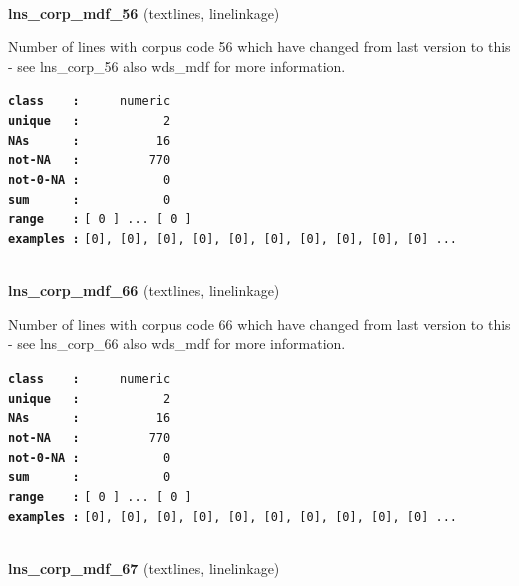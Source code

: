 \documentclass[]{article}
\begin{document}
~

\textbf{lns\_corp\_mdf\_56} (textlines, linelinkage)

Number of lines with corpus code 56 which have changed from last version
to this - see lns\_corp\_56 also wds\_mdf for more information.

\textbf{\texttt{class\ \ \ \ :}} \texttt{~~~~~numeric}\\
\textbf{\texttt{unique\ \ \ :}} \texttt{~~~~~~~~~~~2}\\
\textbf{\texttt{NAs\ \ \ \ \ \ :}} \texttt{~~~~~~~~~~16}\\
\textbf{\texttt{not-NA\ \ \ :}} \texttt{~~~~~~~~~770}\\
\textbf{\texttt{not-0-NA\ :}} \texttt{~~~~~~~~~~~0}\\
\textbf{\texttt{sum\ \ \ \ \ \ :}} \texttt{~~~~~~~~~~~0}\\
\textbf{\texttt{range\ \ \ \ :}}
\texttt{{[}\ 0\ {]}\ ...\ {[}\ 0\ {]}}\\
\textbf{\texttt{examples\ :}}
\texttt{{[}0{]},\ {[}0{]},\ {[}0{]},\ {[}0{]},\ {[}0{]},\ {[}0{]},\ {[}0{]},\ {[}0{]},\ {[}0{]},\ {[}0{]}\ ...}\\

~

\textbf{lns\_corp\_mdf\_66} (textlines, linelinkage)

Number of lines with corpus code 66 which have changed from last version
to this - see lns\_corp\_66 also wds\_mdf for more information.

\textbf{\texttt{class\ \ \ \ :}} \texttt{~~~~~numeric}\\
\textbf{\texttt{unique\ \ \ :}} \texttt{~~~~~~~~~~~2}\\
\textbf{\texttt{NAs\ \ \ \ \ \ :}} \texttt{~~~~~~~~~~16}\\
\textbf{\texttt{not-NA\ \ \ :}} \texttt{~~~~~~~~~770}\\
\textbf{\texttt{not-0-NA\ :}} \texttt{~~~~~~~~~~~0}\\
\textbf{\texttt{sum\ \ \ \ \ \ :}} \texttt{~~~~~~~~~~~0}\\
\textbf{\texttt{range\ \ \ \ :}}
\texttt{{[}\ 0\ {]}\ ...\ {[}\ 0\ {]}}\\
\textbf{\texttt{examples\ :}}
\texttt{{[}0{]},\ {[}0{]},\ {[}0{]},\ {[}0{]},\ {[}0{]},\ {[}0{]},\ {[}0{]},\ {[}0{]},\ {[}0{]},\ {[}0{]}\ ...}\\

~

\textbf{lns\_corp\_mdf\_67} (textlines, linelinkage)
\end{document}
